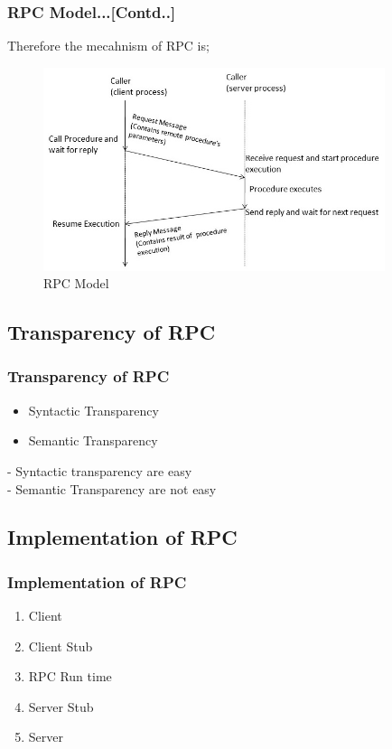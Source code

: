 \documentclass{beamer}
\begin{document}
\begin{frame}
	\frametitle{RPC Model...[Contd..]}
	 Therefore the mecahnism of RPC is;
	 \begin{figure}
	 	\centering
	 	\includegraphics[width=10cm]{fig41.jpg}
	 	\caption{RPC Model}
	 \end{figure}
\end{frame}

\subsection{Transparency of RPC}
\begin{frame}
	\frametitle{Transparency of RPC}
	\vspace{0.2cm}
	\begin{itemize}
		\item Syntactic Transparency
		\item Semantic Transparency
	\end{itemize}
	\vspace{0.5cm}
	- Syntactic transparency are easy\\
	- Semantic Transparency are not easy
	\vspace{3cm}
\end{frame}

\subsection{Implementation of RPC}
\begin{frame}
	\frametitle{Implementation of RPC}
	\begin{enumerate}
		\item Client
		\item Client Stub
		\item RPC Run time
		\item Server Stub
		\item Server
	\end{enumerate}
	\vspace{3cm}
\end{frame}
\end{document}
